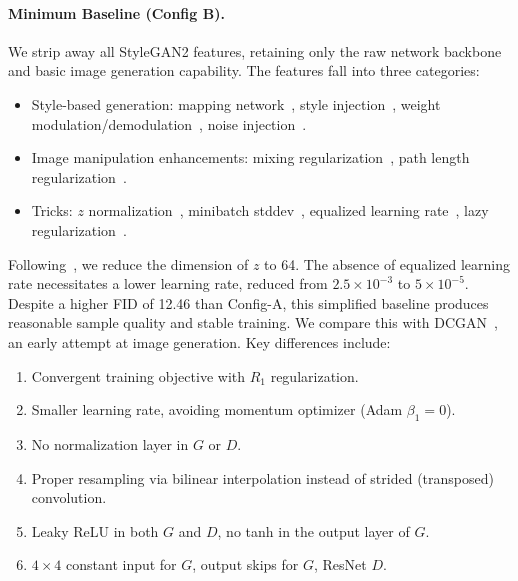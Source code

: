 \vspace{-1ex}
\paragraph{Minimum Baseline (Config B).}
We strip away all StyleGAN2 features, retaining only the raw network backbone and basic image generation capability. The features fall into three categories:
\begin{itemize}[leftmargin=10pt,itemsep=0pt,topsep=0pt]
\item Style-based generation: mapping network~\cite{sg1}, style injection~\cite{sg1}, weight modulation/demodulation~\cite{sg2}, noise injection~\cite{sg1}.
\end{itemize}\quad %
\begin{itemize}[leftmargin=10pt,itemsep=0pt,topsep=0pt]
\vspace{-0.25cm} %
\item Image manipulation enhancements: mixing regularization~\cite{sg1}, path length regularization~\cite{sg2}.
\item Tricks: $z$ normalization~\cite{pggan}, minibatch stddev~\cite{pggan}, equalized learning rate~\cite{pggan}, lazy regularization~\cite{sg2}.
\end{itemize}

Following~\cite{sgxl,sg-t}, we reduce the dimension of $z$ to 64. The absence of equalized learning rate necessitates a lower learning rate, reduced from $2.5\times10^{-3}$ to $5\times10^{-5}$. Despite a higher FID of 12.46 than Config-A, this simplified baseline produces reasonable sample quality and stable training. We compare this with DCGAN~\cite{dcgan}, an early attempt at image generation. Key differences include:
\begin{enumerate}[label=\alph*), noitemsep,topsep=0pt,leftmargin=24pt]
\item Convergent training objective with $R_1$ regularization.\label{item:convergent} 
\item Smaller learning rate, avoiding momentum optimizer (Adam $\beta_1=0$).\label{item:learning_rate} 
\item No normalization layer in $G$ or $D$.\label{item:normalization} 
\item Proper resampling via bilinear interpolation instead of strided (transposed) convolution.\label{item:resampling} 
\item Leaky ReLU in both $G$ and $D$, no tanh in the output layer of $G$.\label{item:activation} 
\item $4\times4$ constant input for $G$, output skips for $G$, ResNet $D$.\label{item:input} 
\end{enumerate}

